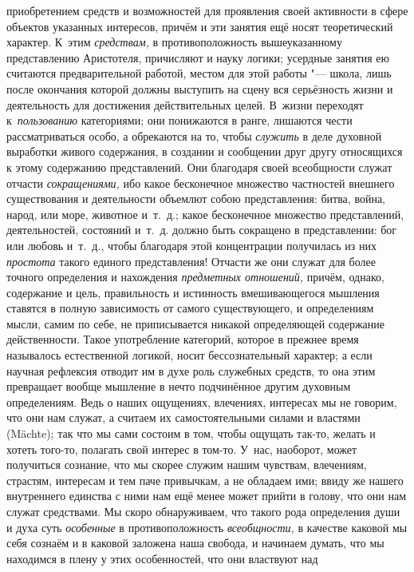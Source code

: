 приобретением средств и возможностей для проявления своей активности в сфере
объектов указанных интересов, причём и эти занятия ещё носят теоретический
характер. К~этим {\em средствам,} в противоположность вышеуказанному
представлению Аристотеля, причисляют и науку логики; усердные занятия ею
считаются предварительной работой, местом для этой работы "--- школа, лишь
после окончания которой должны выступить на сцену вся серьёзность жизни и
деятельность для достижения действительных целей. В~жизни переходят
к~{\em пользованию} категориями; они понижаются в ранге, лишаются чести
рассматриваться особо, а обрекаются на то, чтобы {\em служить} в деле духовной
выработки живого содержания, в создании и сообщении друг другу относящихся к
этому содержанию представлений. Они благодаря своей всеобщности служат отчасти
{\em сокращениями,} ибо какое бесконечное множество частностей внешнего
существования и деятельности объемлют собою представления: битва, война, народ,
или море, животное и~т.~д.; какое бесконечное множество представлений,
деятельностей, состояний и~т.~д. должно быть сокращено в представлении: бог или
любовь и~т.~д., чтобы благодаря этой концентрации получилась из них
{\em простота} такого единого представления! Отчасти же они служат для более
точного определения и нахождения {\em предметных отношений,} причём, однако,
содержание и цель, правильность и истинность вмешивающегося мышления ставятся в
полную зависимость от самого существующего, и определениям мысли, самим по
себе, не приписывается никакой определяющей содержание действенности. Такое
употребление категорий, которое в прежнее время называлось естественной
логикой, носит бессознательный характер; а если научная рефлексия отводит им в
духе роль служебных средств, то она этим превращает вообще мышление в нечто
подчинённое другим духовным определениям. Ведь о наших ощущениях, влечениях,
интересах мы не говорим, что они нам служат, а считаем их самостоятельными
силами и властями (Mächte); так что мы сами состоим в том, чтобы ощущать
так-то, желать и хотеть того-то, полагать свой интерес в том-то. У~нас,
наоборот, может получиться сознание, что мы скорее служим нашим чувствам,
влечениям, страстям, интересам и тем паче привычкам, а не обладаем ими; ввиду
же нашего внутреннего единства с ними нам ещё менее может прийти в голову, что
они нам служат средствами. Мы скоро обнаруживаем, что такого рода определения
души и духа суть {\em особенные} в противоположность {\em всеобщности,} в
качестве каковой мы себя сознаём и в каковой заложена наша свобода, и начинаем
думать, что мы находимся в плену у этих особенностей, что они властвуют над
